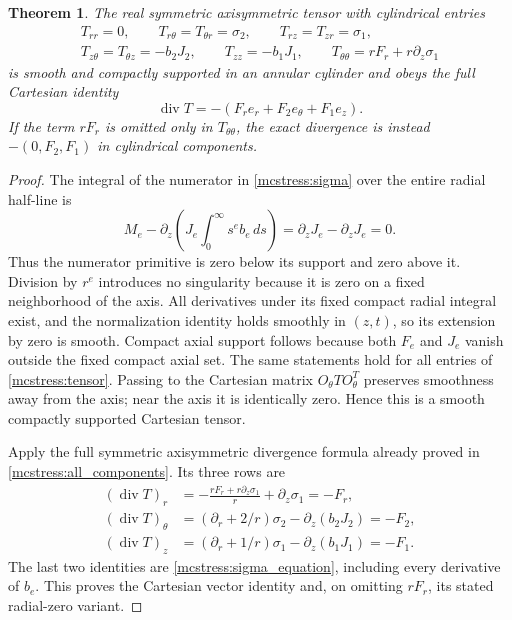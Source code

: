\documentclass[11pt]{article}
\newtheorem{theorem}{Theorem}
\begin{document}
\begin{theorem}\label{mcstress:completion}
The real symmetric axisymmetric tensor with cylindrical entries
\begin{equation}\label{mcstress:tensor}
\begin{gathered}
 T_{rr}=0,\qquad T_{r\theta}=T_{\theta r}=\sigma_2,\qquad
 T_{rz}=T_{zr}=\sigma_1,\\
 T_{z\theta}=T_{\theta z}=-b_2J_2,\qquad
 T_{zz}=-b_1J_1,\qquad
 T_{\theta\theta}=rF_r+r\partial_z\sigma_1
\end{gathered}
\end{equation}
is smooth and compactly supported in an annular cylinder and obeys
the full Cartesian identity
\begin{equation}\label{mcstress:divergence}
 \operatorname{div}T=-(F_r e_r+F_2e_\theta+F_1e_z).
\end{equation}
If the term $rF_r$ is omitted only in $T_{\theta\theta}$, the exact
divergence is instead $-(0,F_2,F_1)$ in cylindrical components.
\end{theorem}
\begin{proof}
The integral of the numerator in \eqref{mcstress:sigma} over the
entire radial half-line is
\[
 M_e-\partial_z\left(J_e\int_0^\infty s^eb_e\,ds\right)
  =\partial_zJ_e-\partial_zJ_e=0.
\]
Thus the numerator primitive is zero below its support and zero above
it. Division by $r^e$ introduces no singularity because it is zero on
a fixed neighborhood of the axis. All derivatives under its fixed
compact radial integral exist, and the normalization identity holds
smoothly in $(z,t)$, so its extension by zero is smooth. Compact axial
support follows because both $F_e$ and $J_e$ vanish outside the fixed
compact axial set. The same statements hold for all entries of
\eqref{mcstress:tensor}. Passing to the Cartesian matrix
$O_\theta T O_\theta^T$ preserves smoothness away from the axis; near
the axis it is identically zero. Hence this is a smooth compactly
supported Cartesian tensor.

Apply the full symmetric axisymmetric divergence formula already
proved in \eqref{mcstress:all_components}. Its three rows are
\[
 \begin{aligned}
 (\operatorname{div}T)_r
   &=-\frac{rF_r+r\partial_z\sigma_1}{r}
                                     +\partial_z\sigma_1=-F_r,\\
 (\operatorname{div}T)_\theta
   &=(\partial_r+2/r)\sigma_2-\partial_z(b_2J_2)=-F_2,\\
 (\operatorname{div}T)_z
   &=(\partial_r+1/r)\sigma_1-\partial_z(b_1J_1)=-F_1.
 \end{aligned}
\]
The last two identities are \eqref{mcstress:sigma_equation}, including
every derivative of $b_e$. This proves the Cartesian vector identity
and, on omitting $rF_r$, its stated radial-zero variant.
\end{proof}
\end{document}
